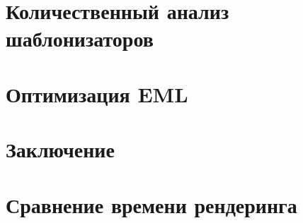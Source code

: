 \newpage
\section{Количественный анализ шаблонизаторов}


\newpage
\section{Оптимизация EML}


\newpage
\section*{Заключение}





\appendix
{}
\section{Сравнение времени рендеринга}




